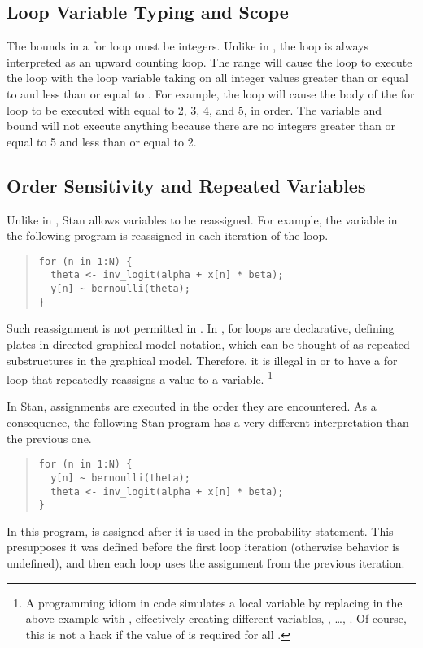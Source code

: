 \subsection{Loop Variable Typing and Scope}

The bounds in a for loop must be integers.  Unlike in \R, the loop is
always interpreted as an upward counting loop.  The range 
will cause the loop to execute the loop with the loop variable taking
on all integer values greater than or equal to  and less than
or equal to .  For example, the loop 
will cause the body of the for loop to be executed with  equal
to 2, 3, 4, and 5, in order.  The variable and bound  will not execute anything because there are no integers
greater than or equal to 5 and less than or equal to 2.

\subsection{Order Sensitivity and Repeated Variables}

Unlike in \BUGS, Stan allows variables to be reassigned.  For
example, the variable  in the following program is
reassigned in each iteration of the loop.
%
\begin{quote}
\begin{Verbatim} 
for (n in 1:N) {
  theta <- inv_logit(alpha + x[n] * beta);
  y[n] ~ bernoulli(theta);
}
\end{Verbatim}
\end{quote}
% 
Such reassignment is not permitted in \BUGS.  In \BUGS, for loops are
declarative, defining plates in directed graphical model notation,
which can be thought of as repeated substructures in the graphical
model.  Therefore, it is illegal in \BUGS or \JAGS to have a for loop
that repeatedly reassigns a value to a variable.%
%
\footnote{A programming idiom in \BUGS code simulates 
a local variable by replacing  in the above example with
, effectively creating  different variables,
, \ldots, .  Of course, this is not a
hack if the value of  is required for all .}

In Stan, assignments are executed in the order they are encountered.
As a consequence, the following Stan program has a very different
interpretation than the previous one.
%
\begin{quote}
\begin{Verbatim}
for (n in 1:N) {
  y[n] ~ bernoulli(theta);
  theta <- inv_logit(alpha + x[n] * beta);
}
\end{Verbatim}
\end{quote}
%
In this program,  is assigned after it is used in the
probability statement.  This presupposes it was defined before the
first loop iteration (otherwise behavior is undefined), and then each
loop uses the assignment from the previous iteration. 

